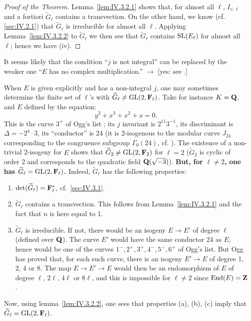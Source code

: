 \begin{proof}[Proof of the Theorem]
Lemma~\ref{lem:IV.3.2.1} shows that, for almost all $\ell$, $I_{v,\ell}$ and a fortiori $\widetilde{G}_\ell$ contains a transvection. On the other hand, we know (cf. \ref{sec:IV.2.1}) that $\widetilde{G}_\ell$ is irreducible for almost all $\ell$. Applying Lemma~\ref{lem:IV.3.2.2} to $\widetilde{G}_\ell$ we then see that $\widetilde{G}_\ell$ contains $\mathrm{SL}(E_\ell)$ for almost all $\ell$; hence we have (iv).
\end{proof}

\begin{remarks}
It seems likely that the condition ``$j$ is not integral'' can be replaced by the weaker one ``$E$ has no complex multiplication.'' \hspace{0.3em}$\rightarrow$ [yes: see \cite{serre-proprietes}.]
\end{remarks}


When $E$ is given explicitly and has a non-integral $j$, one may sometimes determine the finite set of $\ell$'s with $\widetilde{G}_\ell \neq \mathrm{GL}(2,\mathbf{F}_\ell)$. Take for instance $K=\mathbf{Q}$, and $E$ defined by the equation:
\[
  y^2 + x^3 + x^2 + x = 0.
\]
This is the curve $3^{+}$ of Ogg's list \cite{ogg}; its $j$ invariant is $2^{11}3^{-1}$, its discriminant is $\Delta = -2^4 \cdot 3$, its ``conductor'' is 24 (it is 2-isogenous to the modular curve $J_{24}$ corresponding to the congruence subgroup $\Gamma_0(24)$, cf. \cite{ogg}). The existence of a non-trivial 2-isogeny for $E$ shows that $\widetilde{G}_2 \neq \mathrm{GL}(2,\mathbf{F}_2)$ for $\ell=2$ ($\widetilde{G}_2$ is cyclic of order 2 and corresponds to the quadratic field $\mathbf{Q}(\sqrt{-3})$). \textbf{But, for $\ell \neq 2$, one has $\widetilde{G}_\ell = \mathrm{GL}(2,\mathbf{F}_\ell)$.} Indeed, $\widetilde{G}_\ell$ has the following properties:
\begin{enumerate}
\item[(a)] $\det(\widetilde{G}_\ell) = \mathbf{F}_\ell^{*}$, cf.~\ref{sec:IV.3.1}.
\item[(b)] $\widetilde{G}_\ell$ contains a transvection. This follows from Lemma~\ref{lem:IV.3.2.1} and the fact that $n$ is here equal to 1.
\item[(c)] $\widetilde{G}_\ell$ is irreducible. If not, there would be an isogeny $E \to E'$ of degree $\ell$ (defined over $\mathbf{Q}$). The curve $E'$ would have the same conductor 24 as $E$, hence would be one of the curves $1^{-},2^{+},3^{+},4^{-},5^{-},6^{+}$ of Ogg's list. But Ogg has proved that, for each such curve, there is an isogeny $E' \to E$ of degree 1, 2, 4 or 8. The map $E \to E' \to E$ would then be an endomorphism of $E$ of degree $\ell$, $2\ell$, $4\ell$ or $8\ell$, and this is impossible for $\ell \neq 2$ since $\mathrm{End}(E)=\mathbf{Z}$.
\end{enumerate}
Now, using lemma~\ref{lem:IV.3.2.2}, one sees that properties (a), (b), (c) imply that $\widetilde{G}_\ell = \mathrm{GL}(2,\mathbf{F}_\ell)$.

